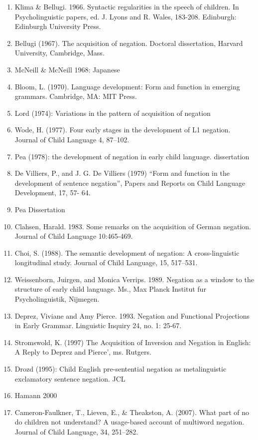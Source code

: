 \documentclass[man,floatsintext,draftall]{apa6}
\begin{document}
\begin{enumerate}
\def\labelenumi{\arabic{enumi}.}
\item
  Klima \& Bellugi. 1966. Syntactic regularities in the speech of children. In Psycholinguistic papers, ed. J. Lyons and R. Wales, 183-208. Edinburgh: Edinburgh University Press.
\item
  Bellugi (1967). The acquisition of negation. Doctoral dissertation, Harvard University, Cambridge, Mass.
\item
  McNeill \& McNeill 1968: Japanese
\item
  Bloom, L. (1970). Language development: Form and function in emerging grammars. Cambridge, MA: MIT Press.
\item
  Lord (1974): Variations in the pattern of acquisition of negation
\item
  Wode, H. (1977). Four early stages in the development of L1 negation. Journal of Child Language 4, 87--102.
\item
  Pea (1978): the development of negation in early child language. dissertation
\item
  De Villiers, P., and J. G. De Villiers (1979) \enquote{Form and function in the development of sentence negation}, Papers and Reports on Child Language Development, 17, 57- 64.
\item
  Pea Dissertation
\item
  Clahsen, Harald. 1983. Some remarks on the acquisition of German negation. Journal of Child Language 10:465-469.
\item
  Choi, S. (1988). The semantic development of negation: A cross-linguistic longitudinal study. Journal of Child Language, 15, 517--531.
\item
  Weissenborn, Juirgen, and Monica Verrips. 1989. Negation as a window to the structure of early child language. Ms., Max Planck Institut fur Psycholinguistik, Nijmegen.
\item
  Deprez, Viviane and Amy Pierce. 1993. Negation and Functional Projections in Early Grammar. Linguistic Inquiry 24, no. 1: 25-67.
\item
  Stromswold, K. (1997) The Acquisition of Inversion and Negation in English: A Reply to Deprez and Pierce', ms. Rutgers.
\item
  Drozd (1995): Child English pre-sentential negation as metalinguistic exclamatory sentence negation. JCL
\item
  Hamann 2000
\item
  Cameron-Faulkner, T., Lieven, E., \& Theakston, A. (2007). What part of no do children not understand? A usage-based account of multiword negation. Journal of Child Language, 34, 251--282.

\end{enumerate}
\end{document}
